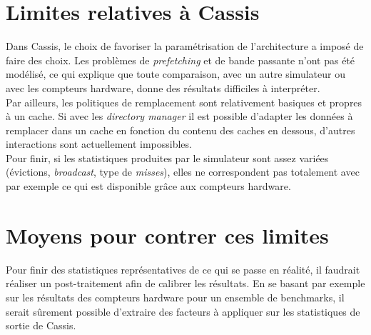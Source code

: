 \section{Limites relatives à \textsf{Cassis}}
Dans \textsf{Cassis}, le choix de favoriser la paramétrisation de l'architecture a imposé de faire des choix. Les problèmes de \emph{prefetching} et de bande passante n'ont pas été modélisé, ce qui explique que toute comparaison, avec un autre simulateur ou avec les compteurs hardware, donne des résultats difficiles à interpréter. \\

Par ailleurs, les politiques de remplacement sont relativement basiques et propres à un cache. Si avec les \emph{directory manager} il est possible d'adapter les données à remplacer dans un cache en fonction du contenu des caches en dessous, d'autres interactions sont actuellement impossibles. \\

Pour finir, si les statistiques produites par le simulateur sont assez variées (évictions, \emph{broadcast}, type de \emph{misses}), elles ne correspondent pas totalement avec par exemple ce qui est disponible grâce aux compteurs hardware.

\section{Moyens pour contrer ces limites}
Pour finir des statistiques représentatives de ce qui se passe en réalité, il faudrait réaliser un post-traitement afin de calibrer les résultats. En se basant par exemple sur les résultats des compteurs hardware pour un ensemble de benchmarks, il serait sûrement possible d'extraire des facteurs à appliquer sur les statistiques de sortie de \textsf{Cassis}.

